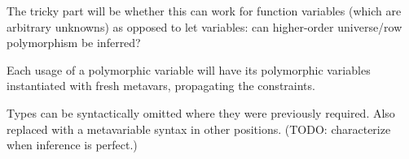 \documentclass[11pt, twoside, reqno]{book}
\begin{document}
The tricky part will be whether this can work for function variables (which are arbitrary unknowns) as opposed to let variables: can higher-order universe/row polymorphism be inferred?

Each usage of a polymorphic variable will have its polymorphic variables instantiated with fresh metavars, propagating the constraints.

Types can be syntactically omitted where they were previously required.
Also replaced with a metavariable syntax in other positions.
(TODO: characterize when inference is perfect.)


\iffalse
\begin{appdices}
\end{appdices}


\begin{bibliog}
\end{bibliog}
\fi
\end{document}
